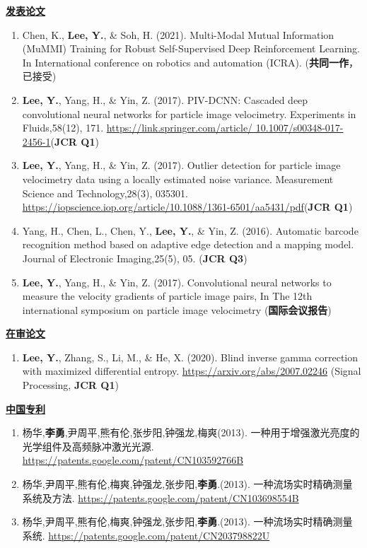 \documentclass[a4paper,fontsize=11pt]{scrartcl} %
\newcommand{\stitle}[1]{
	\noindent\underline{\textbf{#1}} \normalsize\par}
\begin{document}
\stitle{发表论文}
\begin{enumerate}
	\setlength\itemsep{0.0cm}
	\item Chen, K., \textbf{Lee, Y.}, \& Soh, H. (2021). Multi-Modal Mutual Information (MuMMI) Training for Robust Self-Supervised Deep Reinforcement Learning. In International conference on robotics and automation (ICRA). (\textbf{共同一作}，已接受)
	\item \textbf{Lee, Y.}, Yang, H., \& Yin, Z. (2017). PIV-DCNN: Cascaded deep convolutional neural networks for particle image velocimetry. Experiments in Fluids,58(12), 171. \href{https://link.springer.com/article/10.1007/s00348-017-2456-1}{https://link.springer.com/article/ 10.1007/s00348-017-2456-1}(\textbf{JCR Q1})
	\item \textbf{Lee, Y.}, Yang, H., \& Yin, Z. (2017). Outlier detection for particle image velocimetry data using a locally estimated noise variance. Measurement Science and Technology,28(3), 035301. \href{https://iopscience.iop.org/article/10.1088/1361-6501/aa5431/pdf}{https://iopscience.iop.org/article/10.1088/1361-6501/aa5431/pdf}(\textbf{JCR Q1})
	\item Yang, H., Chen, L., Chen, Y., \textbf{Lee, Y.}, \& Yin, Z. (2016). Automatic barcode recognition method based on adaptive edge detection and a mapping model. Journal of Electronic Imaging,25(5), 05. (\textbf{JCR Q3})
	\item \textbf{Lee, Y.}, Yang, H., \& Yin, Z. (2017). Convolutional neural networks to measure the velocity gradients of particle image pairs, In The 12th international symposium on particle image velocimetry (\textbf{国际会议报告})
\end{enumerate}

\stitle{在审论文}
\begin{enumerate}
	\item \textbf{Lee, Y.}, Zhang, S., Li, M., \& He, X. (2020). Blind inverse gamma correction with maximized differential entropy. \href{https://arxiv.org/abs/2007.02246}{https://arxiv.org/abs/2007.02246}  (Signal Processing, \textbf{JCR Q1})
\end{enumerate}

\stitle{中国专利}
\begin{enumerate}
	\setlength\itemsep{0.0cm}
	\item 杨华,\textbf{李勇},尹周平,熊有伦,张步阳,钟强龙,梅爽(2013). 一种用于增强激光亮度的光学组件及高频脉冲激光光源. \href{https://patents.google.com/patent/CN103592766B}{https://patents.google.com/patent/CN103592766B}
	\item 杨华,尹周平,熊有伦,梅爽,钟强龙,张步阳,\textbf{李勇}.(2013). 一种流场实时精确测量系统及方法. \href{https://patents.google.com/patent/CN103698554B}{https://patents.google.com/patent/CN103698554B}
	\item 杨华,尹周平,熊有伦,梅爽,钟强龙,张步阳,\textbf{李勇}.(2013). 一种流场实时精确测量系统. \href{https://patents.google.com/patent/CN203798822U}{https://patents.google.com/patent/CN203798822U}
\end{enumerate}
\newpage
\end{document}
